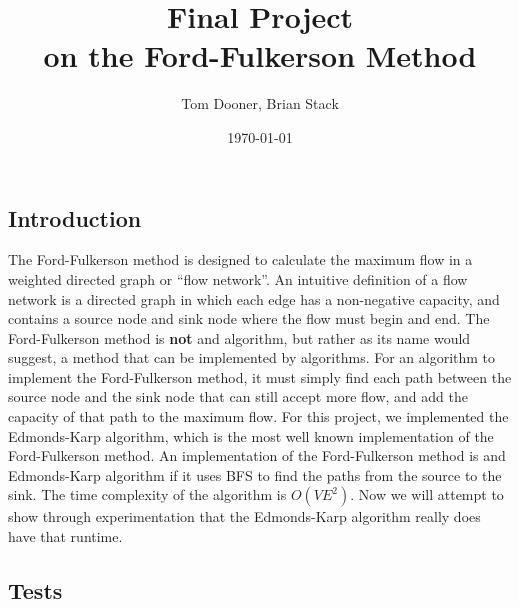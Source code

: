 \documentclass[letterpaper]{report}
\title{Final Project\\ \small{ on the Ford-Fulkerson Method}}
\author{Tom Dooner, Brian Stack}
\date{\today}
\begin{document}
\maketitle

\subsection*{Introduction}

The Ford-Fulkerson method is designed to calculate the maximum flow in a weighted directed graph or ``flow network''.  An intuitive definition of a flow network is a directed graph in which each edge has a non-negative capacity, and contains a source node and sink node where the flow must begin and end.  The Ford-Fulkerson method is \textbf{not} and algorithm, but rather as its name would suggest, a method that can be implemented by algorithms.  For an algorithm to implement the Ford-Fulkerson method, it must simply find each path between the source node and the sink node that can still accept more flow, and add the capacity of that path to the maximum flow.  For this project, we implemented the Edmonds-Karp algorithm, which is the most well known implementation of the Ford-Fulkerson method.  An implementation of the Ford-Fulkerson method is and Edmonds-Karp algorithm if it uses BFS to find the paths from the source to the sink. The time complexity of the algorithm is $O(VE^2)$.  Now we will attempt to show through experimentation that the Edmonds-Karp algorithm really does have that runtime.

\subsection*{Tests}
\end{document}

